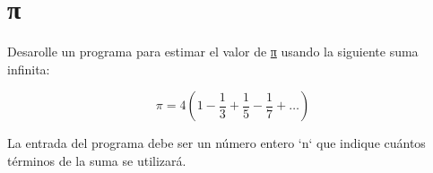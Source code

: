 \section{π}

Desarolle un programa para estimar el valor de
\href{http://es.wikipedia.org/wiki/N\%C3\%BAmero\_\%CF\%80}{π} usando la
siguiente suma infinita:

\[\pi = 4 \left(1-\frac{1}{3}+\frac{1}{5}-\frac{1}{7}+ \ldots \right)\]

La entrada del programa debe ser un número entero `n` que indique
cuántos términos de la suma se utilizará.
